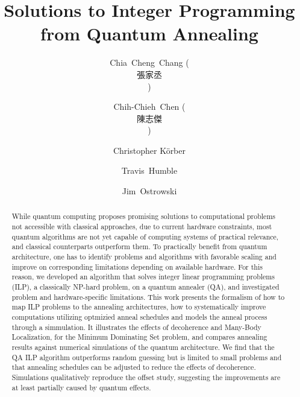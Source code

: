 \documentclass[prd,twocolumn,tightenlines,preprintnumbers,showpacs,superscriptaddress,notitlepage,nofootinbib,eqsecnum,floatfix,longbibliography,aps,10pt]{revtex4-2}
\begin{document}
\title{Solutions to Integer Programming from Quantum Annealing}

\author{Chia~Cheng~Chang (\begin{CJK*}{UTF8}{bsmi}張家丞\end{CJK*})}
	\author{Chih-Chieh~Chen (\begin{CJK*}{UTF8}{bsmi}\mbox{陳志傑}\end{CJK*})}
\author{Christopher K\"orber}
\author{Travis~Humble}
\author{Jim~Ostrowski}

\newcommand{\alert}[1]{\textbf{\color{red}{#1}}}
\renewcommand{\vec}[1]{\boldsymbol{#1}}

\newcommand{\ghissue}[2]{
 \noindent\fbox{\parbox{0.49\textwidth}{
   \alert{[#1]}%
   \\%
   \href{https://github.com/cchang5/quantum\_linear\_programming/pull/#2}{See GitHub issue #2}}%
 }
}


\begin{abstract}
 While quantum computing proposes promising solutions to computational problems not accessible with classical approaches, due to current hardware constraints, most quantum algorithms are not yet capable of computing systems of practical relevance, and classical counterparts outperform them.
 To practically benefit from quantum architecture, one has to identify problems and algorithms with favorable scaling and improve on corresponding limitations depending on available hardware.
 For this reason, we developed an algorithm that solves integer linear programming problems (ILP), a classically NP-hard problem, on a quantum annealer (QA), and investigated problem and hardware-specific limitations.
 This work presents the formalism of how to map ILP problems to the annealing architectures, how to systematically improve computations utilizing optmizied anneal schedules and models the anneal process through a simmulation.
 It illustrates the effects of decoherence and Many-Body Localization, for the Minimum Dominating Set problem, and compares annealing results against numerical simulations of the quantum architecture.
 We find that the QA ILP algorithm outperforms random guessing but is limited to small problems and that annealing schedules can be adjusted to reduce the effects of decoherence.
 Simulations qualitatively reproduce the offset study, suggesting the improvements are at least partially caused by quantum effects.
\end{abstract}
\end{document}

